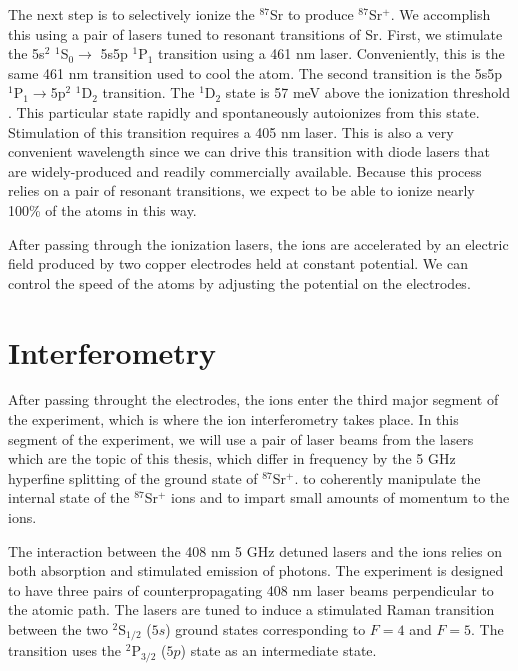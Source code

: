 The next step is to selectively ionize the $^{87}$Sr to produce $^{87}$Sr$^+$. We accomplish this using a pair of lasers tuned to resonant transitions of Sr. First, we stimulate the 5s$^2$ $^1$S$_0 \rightarrow$ 5s5p $^1$P$_1$ transition using a 461 nm laser. Conveniently, this is the same 461 nm transition used to cool the atom. The second transition is the 5s5p $^1$P$_1\rightarrow$5p$^2$ $^1$D$_2$ transition. The $^1$D$_2$ state is 57 meV above the ionization threshold \cite{NSFprop}. This particular state rapidly and spontaneously autoionizes from this state. Stimulation of this transition requires a 405 nm laser. This is also a very convenient wavelength since we can drive this transition with diode lasers that are widely-produced and readily commercially available. Because this process relies on a pair of resonant transitions, we expect to be able to ionize nearly 100\% of the atoms in this way. 

After passing through the ionization lasers, the ions are accelerated by an electric field produced by two copper electrodes held at constant potential. We can control the speed of the atoms by adjusting the potential on the electrodes.%

\section{Interferometry}

After passing throught the electrodes, the ions enter the third major segment of the experiment, which is where the ion interferometry takes place. In this segment of the experiment, we will use a pair of laser beams from the lasers which are the topic of this thesis, which differ in frequency by the 5 GHz hyperfine splitting of the ground state of $^{87}$Sr$^+$.
to coherently manipulate the internal state of the $^{87}$Sr$^+$ ions and to impart small amounts of momentum to the ions. 

The interaction between the 408 nm 5 GHz detuned lasers and the ions relies on both absorption and stimulated emission of photons. The experiment is designed to have three pairs of counterpropagating 408 nm laser beams perpendicular to the atomic path. The lasers are tuned to induce a stimulated Raman transition between the two $^2$S$_{1/2}$ ($5s$) ground states corresponding to $F=4$ and $F=5$. The transition uses the $^2$P$_{3/2}$ ($5p$) state as an intermediate state.

